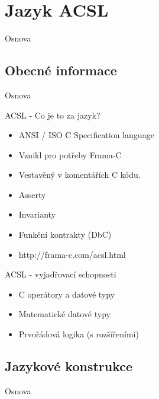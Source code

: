 \documentclass[11pt]{beamer}
\begin{document}
\section{Jazyk ACSL}

\begin{frame}{Osnova}
\end{frame}
\subsection{Obecné informace}

\begin{frame}{Osnova}
\end{frame}


\begin{frame}{ACSL - Co je to za jazyk?}
\begin{itemize}
	\item ANSI / ISO C Specification language
	\item Vznikl pro potřeby Frama-C
	\item Vestavěný v komentářích C kódu.
	\item Asserty
	\item Invarianty
	\item Funkční kontrakty (DbC)
	\item http://frama-c.com/acsl.html
\end{itemize}
\end{frame}

\begin{frame}{ACSL - vyjadřovací schopnosti}
\begin{itemize}
	\item C operátory a datové typy
	\item Matematické datové typy
	\item Prvořádová logika (s rozšířeními)
\end{itemize}
\end{frame}


\subsection{Jazykové konstrukce}

\begin{frame}{Osnova}
\end{frame}


\end{document}
